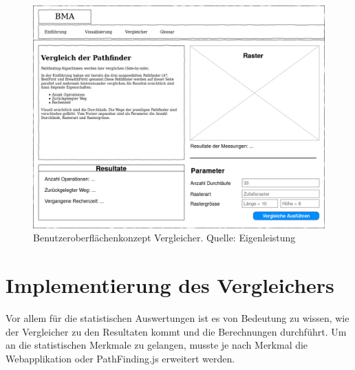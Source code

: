 \documentclass[12pt,a4paper,german]{report}
\begin{document}
\begin{figure}[H]
  \centering
  \includegraphics[width=16cm]{konzept1}
  \caption[Benutzeroberflächenkonzept des Pathfinder-Vergleichers.]{Benutzeroberflächenkonzept Vergleicher. Quelle: Eigenleistung}
  \label{fig:gui_konzept_comparator}
\end{figure}

\section{Implementierung des Vergleichers}
Vor allem für die statistischen Auswertungen ist es von Bedeutung zu wissen, wie der Vergleicher zu den Resultaten kommt und die Berechnungen durchführt. Um an die statistischen Merkmale zu gelangen, musste je nach Merkmal die Webapplikation oder PathFinding.js erweitert werden.
\end{document}
